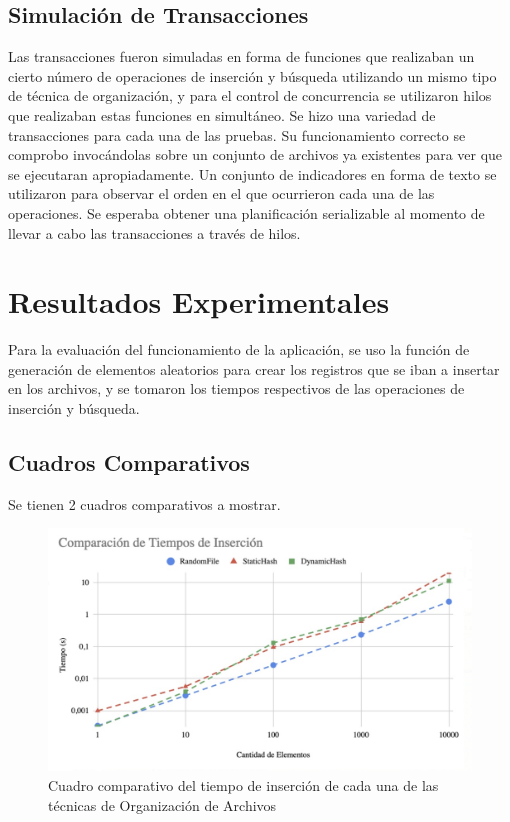 \documentclass{article}
\begin{document}
    \subsection{Simulación de Transacciones}

      Las transacciones fueron simuladas en forma de funciones que realizaban un cierto número de operaciones de inserción y búsqueda utilizando un mismo tipo de técnica de organización, y para el control de concurrencia se utilizaron hilos que realizaban estas funciones en simultáneo. Se hizo una variedad de transacciones para cada una de las pruebas. Su funcionamiento correcto se comprobo invocándolas sobre un conjunto de archivos ya existentes para ver que se ejecutaran apropiadamente. Un conjunto de indicadores en forma de texto se utilizaron para observar el orden en el que ocurrieron cada una de las operaciones. Se esperaba obtener una planificación serializable al momento de llevar a cabo las transacciones a través de hilos.

  \section{Resultados Experimentales}

    Para la evaluación del funcionamiento de la aplicación, se uso la función de generación de elementos aleatorios para crear los registros que se iban a insertar en los archivos, y se tomaron los tiempos respectivos de las operaciones de inserción y búsqueda.

    \subsection{Cuadros Comparativos}

      Se tienen 2 cuadros comparativos a mostrar.
    
      \begin{figure}[h]

        \includegraphics[width = \textwidth]{tiempoInsercion}
        \caption{Cuadro comparativo del tiempo de inserción de cada una de las técnicas de Organización de Archivos}

      \end{figure}
\end{document}
